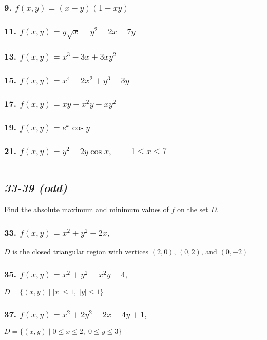 \documentclass{article}
\newcommand{\such}{\; | \;}
\newcommand{\spc}{\vspace{1em}\hrule\vspace{1em}}
\begin{document}
\subsubsection*{9. $f(x,y)=(x-y)(1-xy)$}
\subsubsection*{11. $f(x,y)=y\sqrt x -y^2-2x+7y$}
\subsubsection*{13. $f(x,y)=x^3-3x+3xy^2$}
\subsubsection*{15. $f(x,y)=x^4 - 2x^2+y^3-3y$}
\subsubsection*{17. $f(x,y)=xy-x^2y-xy^2$}
\subsubsection*{19. $f(x,y)=e^x\cos y$}
\subsubsection*{21. $f(x,y)=y^2-2y\cos x,\quad -1 \leq x \leq 7$}
\spc
\begin{center}
    \subsection*{\textit{33-39 (odd)}} 
    Find the absolute maximum and minimum values of $f$ on the set $D$.
\end{center}
\subsubsection*{33. $f(x,y) = x^2+y^2-2x,\quad$}
$D$ is the closed triangular
region with vertices $(2,0)$, $(0,2)$, and $(0,-2)$
\subsubsection*{35. $f(x,y)=x^2+y^2+x^2y+4,$} 
$D = \{(x,y)\such |x| \leq 1,\; |y| \leq 1\}$
\subsubsection*{37. $f(x,y)=x^2+2y^2-2x-4y+1,$}
$D = \{(x,y)\such 0\leq x \leq 2,\;0 \leq y \leq 3\}$
\end{document}

